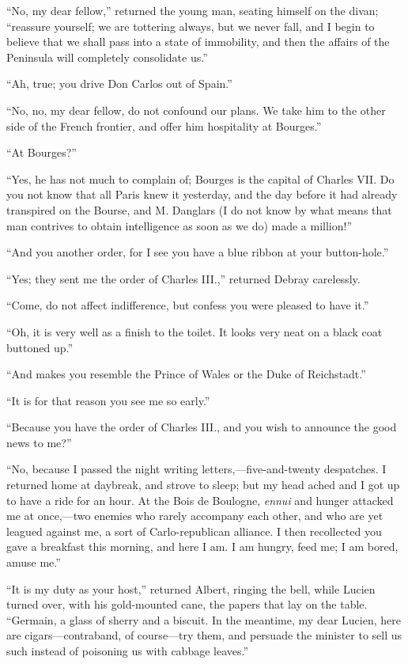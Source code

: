 “No, my dear fellow,” returned the young man, seating himself on the
divan; “reassure yourself; we are tottering always, but we never fall,
and I begin to believe that we shall pass into a state of immobility,
and then the affairs of the Peninsula will completely consolidate us.”

“Ah, true; you drive Don Carlos out of Spain.”

“No, no, my dear fellow, do not confound our plans. We take him to the
other side of the French frontier, and offer him hospitality at
Bourges.”

“At Bourges?”

“Yes, he has not much to complain of; Bourges is the capital of Charles
VII. Do you not know that all Paris knew it yesterday, and the day
before it had already transpired on the Bourse, and M. Danglars (I do
not know by what means that man contrives to obtain intelligence as
soon as we do) made a million!”

“And you another order, for I see you have a blue ribbon at your
button-hole.”

“Yes; they sent me the order of Charles III.,” returned Debray
carelessly.

“Come, do not affect indifference, but confess you were pleased to have
it.”

“Oh, it is very well as a finish to the toilet. It looks very neat on a
black coat buttoned up.”

“And makes you resemble the Prince of Wales or the Duke of Reichstadt.”

“It is for that reason you see me so early.”

“Because you have the order of Charles III., and you wish to announce
the good news to me?”

“No, because I passed the night writing letters,—five-and-twenty
despatches. I returned home at daybreak, and strove to sleep; but my
head ached and I got up to have a ride for an hour. At the Bois de
Boulogne, \textit{ennui} and hunger attacked me at once,—two enemies who
rarely accompany each other, and who are yet leagued against me, a sort
of Carlo-republican alliance. I then recollected you gave a breakfast
this morning, and here I am. I am hungry, feed me; I am bored, amuse
me.”

“It is my duty as your host,” returned Albert, ringing the bell, while
Lucien turned over, with his gold-mounted cane, the papers that lay on
the table. “Germain, a glass of sherry and a biscuit. In the meantime,
my dear Lucien, here are cigars—contraband, of course—try them, and
persuade the minister to sell us such instead of poisoning us with
cabbage leaves.”

